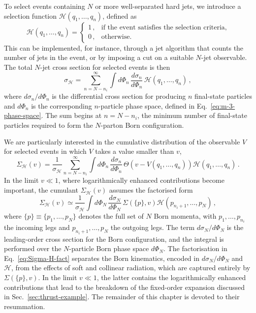To select events containing $N$ or more well-separated hard jets, we 
introduce a selection function $\mathcal{H}(q_1,\dots,q_n)$, defined as
\begin{equation}
\label{eq:H-def}
\mathcal{H}(q_1,\dots,q_n)=
\begin{cases}
1\,, & \text{if the event satisfies the selection criteria,}\\
0\,, & \text{otherwise.}
\end{cases}
\end{equation}
This can be implemented, for instance, through a jet algorithm that counts 
the number of jets in the event, or by imposing a cut on a suitable 
$N$-jet observable. The total $N$-jet cross section for selected events is 
then
\begin{equation}
\label{eq:sigma-H}
  \sigma_{\mathcal{H}}
  = \sum_{n=N-n_i}^{\infty}
    \int d\Phi_n\,\frac{d\sigma_n}{d\Phi_n}\,
    \mathcal{H}(q_1,\dots,q_n)\,,
\end{equation}
where $d\sigma_n/d\Phi_n$ is the differential cross section for producing
$n$ final-state particles and $d\Phi_n$ is the corresponding $n$-particle
phase space, defined in Eq.~\eqref{eq:m-3-phase-space}. The sum begins at
$n = N - n_i$, the minimum number of final-state particles required to
form the $N$-parton Born configuration.

We are particularly interested in the cumulative distribution of the 
observable $V$ for selected events in which $V$ takes a value smaller 
than $v$,
\begin{equation}
\label{eq:Sigma-H}
  \Sigma_{\mathcal{H}}(v)
  = \frac{1}{\sigma_{\mathcal{H}}}
    \sum_{n=N-n_i}^{\infty}
    \int d\Phi_n\,\frac{d\sigma_n}{d\Phi_n}\,
    \Theta\!\left(v - V(q_1,\dots,q_n)\right)
    \mathcal{H}(q_1,\dots,q_n)\,.
\end{equation}
In the limit $v\ll1$, where logarithmically enhanced contributions become
important, the cumulant $\Sigma_{\mathcal H}(v)$ assumes the factorised
form~\cite{Banfi:2004yd}
\begin{equation}
\label{eq:Sigma-H-fact}
  \Sigma_{\mathcal{H}}(v)
  \simeq
  \frac{1}{\sigma_{\mathcal{H}}}
  \int d\Phi_N\,\frac{d\sigma_N}{d\Phi_N}\,
  \Sigma\!\left(\{p\},v\right)
  \mathcal{H}(p_{n_i+1},\dots,p_N)\,,
\end{equation}
where $\{p\} \equiv \{p_1,\dots,p_N\}$ denotes the full set of $N$ Born
momenta, with $p_1,\dots,p_{n_i}$ the incoming legs and
$p_{n_i+1},\dots,p_N$ the outgoing legs. The term $d\sigma_N/d\Phi_N$ is the
leading-order cross section for the Born configuration, and the integral is performed
over the $N$-particle Born phase space $d\Phi_N$. 
The factorisation in Eq.~\eqref{eq:Sigma-H-fact} separates the Born kinematics, encoded in
$d\sigma_N/d\Phi_N$ and $\mathcal{H}$, from the effects of soft and
collinear radiation, which are captured entirely by $\Sigma(\{p\},v)$.
In the limit $v\ll1$, the latter contains the
logarithmically enhanced contributions that lead to the breakdown of the
fixed-order expansion discussed in Sec.~\ref{sec:thrust-example}. The
remainder of this chapter is devoted to their resummation.

